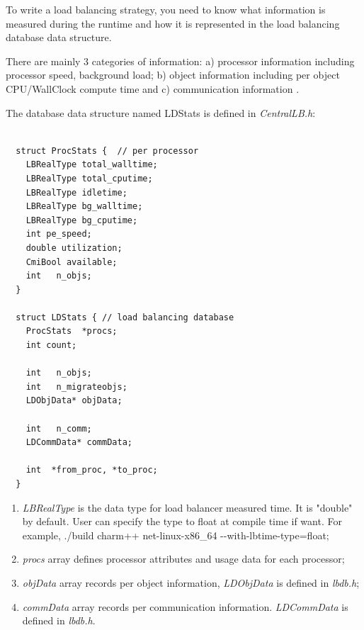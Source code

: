 To write a load balancing strategy, you need to know 
what information is measured during the runtime and how it is represented in
the load balancing database data structure.

There are mainly 3 categories of information: a) processor information including processor speed, background load; b) object information including per object
CPU/WallClock compute time and c) communication information .

The database data structure named {\kw LDStats} is defined in {\em CentralLB.h}:

\begin{verbatim}

  struct ProcStats {  // per processor
    LBRealType total_walltime;
    LBRealType total_cputime;
    LBRealType idletime;
    LBRealType bg_walltime;
    LBRealType bg_cputime;
    int pe_speed;
    double utilization;
    CmiBool available;
    int   n_objs;
  }

  struct LDStats { // load balancing database
    ProcStats  *procs;
    int count;

    int   n_objs;
    int   n_migrateobjs;
    LDObjData* objData;

    int   n_comm;
    LDCommData* commData;

    int  *from_proc, *to_proc;
  }

\end{verbatim}

\begin{enumerate}
\item {\em LBRealType} is the data type for load balancer measured time. It is "double" by default. User can specify the type to float at \charmpp{} compile time if want. For example, ./build charm++ net-linux-x86\_64 {-}{-}with-lbtime-type=float;
\item {\em procs} array defines processor attributes and usage data for each
processor;
\item {\em objData} array records per object information, {\em LDObjData} is defined in {\em lbdb.h};
\item {\em commData} array records per communication information. {\em LDCommData} is defined in {\em lbdb.h}.
\end{enumerate}

